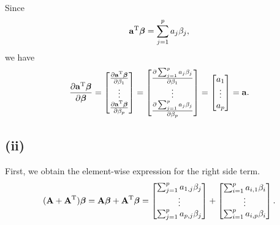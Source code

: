 Since 
\begin{align*}
\bm{\mathrm{a}}^{\rm T}\bm{\beta} =
\sum_{j=1}^{p} a_{j}\beta_{j}
,
\end{align*} we have
\begin{align*}
\frac{\partial \bm{\mathrm{a}}^{\rm T}\bm{\beta}}{\partial \bm{\beta}}
=
\begin{bmatrix}
\frac{\partial \bm{\mathrm{a}}^{\rm T}\bm{\beta}}{\partial \beta_{1}}\\
\vdots\\
\frac{\partial \bm{\mathrm{a}}^{\rm T}\bm{\beta}}{\partial \beta_{p}}\\
\end{bmatrix}
=
\begin{bmatrix}
\frac{\partial \sum_{j=1}^{p} a_{j}\beta_{j}}{\partial \beta_{1}}\\
\vdots\\
\frac{\partial \sum_{j=1}^{p} a_{j}\beta_{j}}{\partial \beta_{p}}\\
\end{bmatrix}
=
\begin{bmatrix}
a_{1}\\
\vdots\\
a_{p}\\
\end{bmatrix}
=
\bm{\mathrm{a}}.
\end{align*}


\subsection*{(ii)}

First, we obtain the element-wise expression for the right side term.
\begin{align*}
(\bm{\mathrm{A}} + \bm{\mathrm{A}}^{\rm T})\bm{\beta}
= \bm{\mathrm{A}}\bm{\beta} + \bm{\mathrm{A}}^{\rm T}\bm{\beta}
= 
\begin{bmatrix}
\sum_{j=1}^{p} a_{1,j}\beta_{j}\\
\vdots\\
\sum_{j=1}^{p} a_{p,j}\beta_{j}\\
\end{bmatrix}
+
\begin{bmatrix}
\sum_{i=1}^{p} a_{i,1}\beta_{i}\\
\vdots\\
\sum_{i=1}^{p} a_{i,p}\beta_{i}\\
\end{bmatrix}.
\end{align*}

